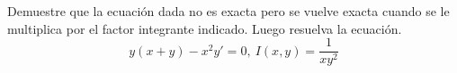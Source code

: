 \item Demuestre que la ecuación dada no es exacta pero se vuelve exacta cuando se le multiplica por el factor integrante indicado. Luego resuelva la ecuación.
    \[ y(x + y) - x^2y' = 0, \ I(x, y) = \frac{1}{xy^2} \]
